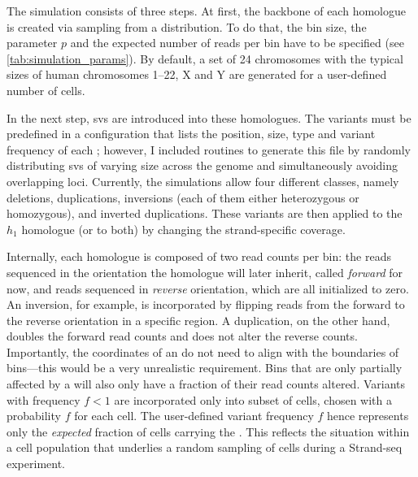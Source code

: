 The simulation consists of three steps. At first, the backbone of each homologue is
created via sampling from a \nb distribution. To do that, the bin size, the \nb
parameter $p$ and the expected number of reads per bin have to be specified
(see \cref{tab:simulation_params}). By default, a set of 24 chromosomes with the
typical sizes of human chromosomes 1--22, X and Y are generated for a user-defined number of cells.

In the next step, \acp{sv} are introduced into these homologues. The variants
must be predefined in a configuration that lists the position, size, \sv type
and variant frequency of each \sv; however, I included routines to generate this
file by randomly distributing \acp{sv} of varying size across the genome and
simultaneously avoiding overlapping loci. Currently, the simulations allow four
different \sv classes, namely deletions, duplications, inversions (each of them
either heterozygous or homozygous), and inverted duplications. These variants
are then applied to the $h_1$ homologue (or to both) by changing the
strand-specific coverage.

Internally, each homologue is composed of two read
counts per bin: the reads sequenced in the orientation the
homologue will later inherit, called \emph{forward} for now, and reads sequenced
in \emph{reverse} orientation, which are all initialized to zero. An inversion,
for example, is incorporated by flipping reads from the forward to the reverse
orientation in a specific region. A duplication, on the other hand, doubles the
forward read counts and does not alter the reverse counts. Importantly, the
coordinates of an \sv do not need to align with the boundaries of bins---this
would be a very unrealistic requirement. Bins that are only partially affected
by a \sv will also only have a fraction of their read counts altered.
Variants with frequency $f<1$ are incorporated only into subset
of cells, chosen with a probability $f$ for each cell. The user-defined
variant frequency $f$ hence represents only the \emph{expected} fraction of cells
carrying the \sv. This reflects the situation within a cell population that
underlies a random sampling of cells during a Strand-seq experiment.

